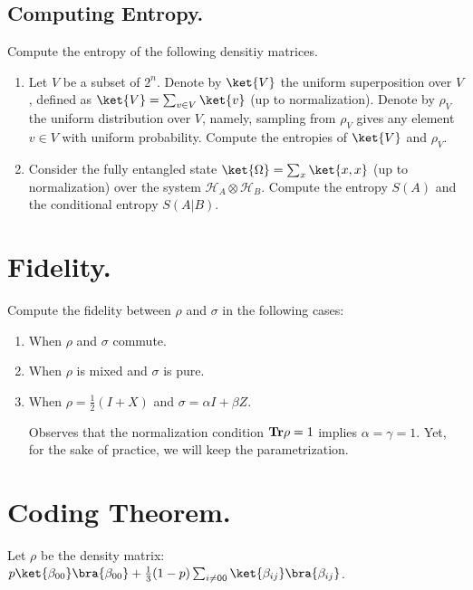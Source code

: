\documentclass[12pt,a4paper]{article}
\begin{document}
\subsection{Computing Entropy.}
Compute the entropy of the following densitiy matrices. 
\begin{enumerate}

  \item Let $V$ be a subset of $2^{n}$. Denote by $\ket{V}$ the uniform superposition over $V$, defined as $\ket{V} = \sum_{v \in V}{\ket{v}}$ (up to normalization). Denote by $\rho_{V}$ the uniform distribution over $V$, namely, sampling from $\rho_{V}$ gives any element $v \in V$ with uniform probability. Compute the entropies of $\ket{V}$ and $\rho_{V}$.
  \item  Consider the fully entangled state $\ket{\Omega} = \sum_{x}{\ket{x,x}}$ (up to normalization) over the system $\mathcal{H}_{A} \otimes \mathcal{H}_{B}$. Compute the entropy $S(A)$ and the conditional entropy $S(A|B)$.
   
\end{enumerate}


\section{Fidelity.}
Compute the fidelity between $\rho$ and $\sigma$ in the following cases: 
\begin{enumerate}
  \item When $\rho$ and $\sigma$ commute. 
  \item When $\rho$ is mixed and $\sigma$ is pure.  
  \item When $\rho = \frac{1}{2}\left( I + X \right)$ and $\sigma = \alpha I + \beta Z$.
  \begin{remark}
Observes that the normalization condition $\mathbf{Tr} \rho = 1$ implies $\alpha = \gamma = 1$. Yet, for the sake of practice, we will keep the parametrization.
  \end{remark}
\end{enumerate}
\section{Coding Theorem.} 
Let $\rho$ be the density matrix: $p \ket{\beta_{00}}\bra{\beta_{00}} + \frac{1}{3}(1-p)\sum_{i \neq 00}{\ket{\beta_{ij}}\bra{\beta_{ij}}}$.

\printbibliography 
\end{document}
